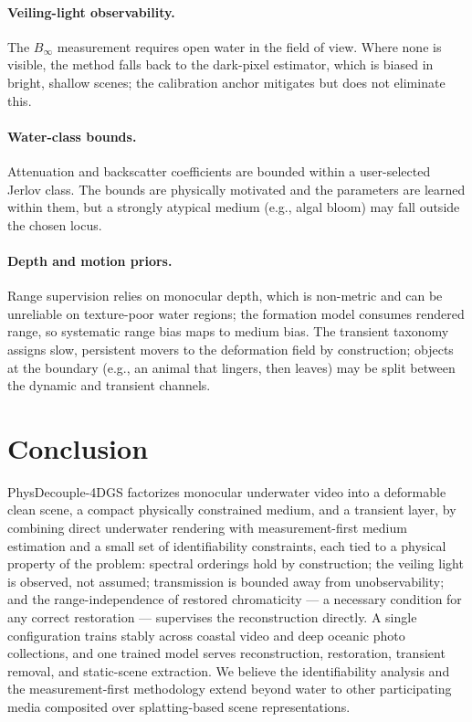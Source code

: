 \documentclass[11pt,a4paper]{article}
\newcommand{\Binf}{B_\infty}
\begin{document}
\paragraph{Veiling-light observability.}
The $\Binf$ measurement requires open water in the field of view. Where none is visible, the method falls back to the dark-pixel estimator, which is biased in bright, shallow scenes; the calibration anchor mitigates but does not eliminate this.

\paragraph{Water-class bounds.}
Attenuation and backscatter coefficients are bounded within a user-selected Jerlov class. The bounds are physically motivated and the parameters are learned within them, but a strongly atypical medium (e.g., algal bloom) may fall outside the chosen locus.

\paragraph{Depth and motion priors.}
Range supervision relies on monocular depth, which is non-metric and can be unreliable on texture-poor water regions; the formation model consumes rendered range, so systematic range bias maps to medium bias. The transient taxonomy assigns slow, persistent movers to the deformation field by construction; objects at the boundary (e.g., an animal that lingers, then leaves) may be split between the dynamic and transient channels.

\section{Conclusion}

PhysDecouple-4DGS factorizes monocular underwater video into a deformable clean scene, a compact physically constrained medium, and a transient layer, by combining direct underwater rendering with measurement-first medium estimation and a small set of identifiability constraints, each tied to a physical property of the problem: spectral orderings hold by construction; the veiling light is observed, not assumed; transmission is bounded away from unobservability; and the range-independence of restored chromaticity --- a necessary condition for any correct restoration --- supervises the reconstruction directly. A single configuration trains stably across coastal video and deep oceanic photo collections, and one trained model serves reconstruction, restoration, transient removal, and static-scene extraction. We believe the identifiability analysis and the measurement-first methodology extend beyond water to other participating media composited over splatting-based scene representations.
\end{document}
